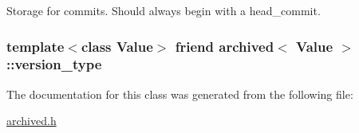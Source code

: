 Storage for commits. Should always begin with a head\+\_\+commit. 

\hypertarget{classarchived_a451217f8620e57386f93a583dcbc3818}{}
\subsubsection[{version\+\_\+type}]{\setlength{\rightskip}{0pt plus 5cm}template$<$class Value$>$ friend {\bf archived}$<$ Value $>$\+::{\bf version\+\_\+type}\hspace{0.3cm}{\ttfamily [private]}}\label{classarchived_a451217f8620e57386f93a583dcbc3818}


The documentation for this class was generated from the following file\+:\begin{DoxyCompactItemize}
\item 
\hyperlink{archived_8h}{archived.\+h}\end{DoxyCompactItemize}
